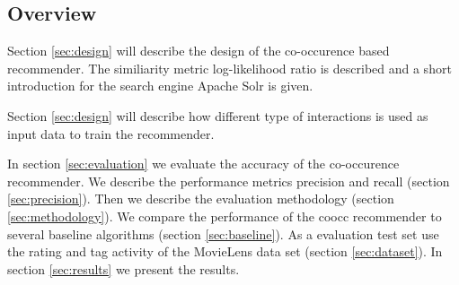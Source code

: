 \subsection{Overview}

Section \ref{sec:design} will describe the design of the co-occurence based recommender. The similiarity metric log-likelihood ratio is described and a short introduction for the search engine Apache Solr is given.

Section \ref{sec:design} will describe how different type of interactions is used as input data to train the recommender.

In section \ref{sec:evaluation} we evaluate the accuracy of the co-occurence recommender. We describe the performance metrics \gls{precision} and \gls{recall} (section \ref{sec:precision}). Then we describe the evaluation methodology (section \ref{sec:methodology}). We compare the performance of the \gls{coocc} recommender to several baseline algorithms (section \ref{sec:baseline}). As a evaluation test set use the rating and tag activity of the MovieLens data set (section \ref{sec:dataset}). In section \ref{sec:results} we present the results.
